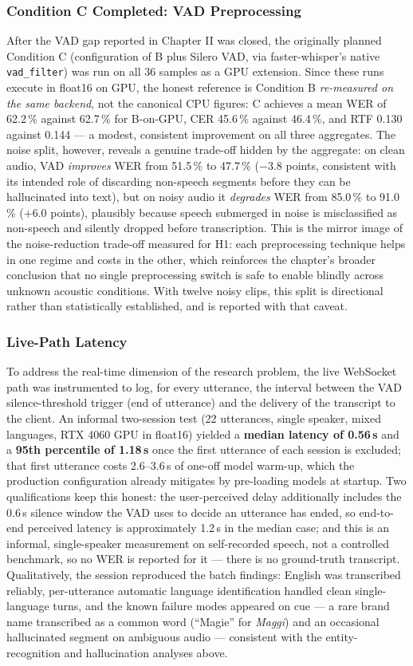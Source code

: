 \documentclass[12pt]{report}
\begin{document}
\subsubsection{Condition C Completed: VAD Preprocessing}
After the VAD gap reported in Chapter II was closed, the originally planned Condition C (configuration of B plus Silero VAD, via faster-whisper's native \texttt{vad\_filter}) was run on all 36 samples as a GPU extension. Since these runs execute in float16 on GPU, the honest reference is Condition B \emph{re-measured on the same backend}, not the canonical CPU figures: C achieves a mean WER of 62.2\,\% against 62.7\,\% for B-on-GPU, CER 45.6\,\% against 46.4\,\%, and RTF 0.130 against 0.144 --- a modest, consistent improvement on all three aggregates. The noise split, however, reveals a genuine trade-off hidden by the aggregate: on clean audio, VAD \emph{improves} WER from 51.5\,\% to 47.7\,\% ($-3.8$ points, consistent with its intended role of discarding non-speech segments before they can be hallucinated into text), but on noisy audio it \emph{degrades} WER from 85.0\,\% to 91.0\,\% ($+6.0$ points), plausibly because speech submerged in noise is misclassified as non-speech and silently dropped before transcription. This is the mirror image of the noise-reduction trade-off measured for H1: each preprocessing technique helps in one regime and costs in the other, which reinforces the chapter's broader conclusion that no single preprocessing switch is safe to enable blindly across unknown acoustic conditions. With twelve noisy clips, this split is directional rather than statistically established, and is reported with that caveat.
\subsubsection{Live-Path Latency}
To address the real-time dimension of the research problem, the live WebSocket path was instrumented to log, for every utterance, the interval between the VAD silence-threshold trigger (end of utterance) and the delivery of the transcript to the client. An informal two-session test (22 utterances, single speaker, mixed languages, RTX 4060 GPU in float16) yielded a \textbf{median latency of 0.56\,s} and a \textbf{95th percentile of 1.18\,s} once the first utterance of each session is excluded; that first utterance costs 2.6--3.6\,s of one-off model warm-up, which the production configuration already mitigates by pre-loading models at startup. Two qualifications keep this honest: the user-perceived delay additionally includes the 0.6\,s silence window the VAD uses to decide an utterance has ended, so end-to-end perceived latency is approximately 1.2\,s in the median case; and this is an informal, single-speaker measurement on self-recorded speech, not a controlled benchmark, so no WER is reported for it --- there is no ground-truth transcript. Qualitatively, the session reproduced the batch findings: English was transcribed reliably, per-utterance automatic language identification handled clean single-language turns, and the known failure modes appeared on cue --- a rare brand name transcribed as a common word (\enquote{Magie} for \emph{Maggi}) and an occasional hallucinated segment on ambiguous audio --- consistent with the entity-recognition and hallucination analyses above.
\end{document}
